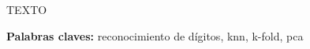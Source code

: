 \begin{addmargin}[5em]{5em}
\section*{\centering \runtitulo}

\noindent TEXTO

\bigskip

\noindent\textbf{Palabras claves:} reconocimiento de dígitos, knn, k-fold, pca
\end{addmargin}
